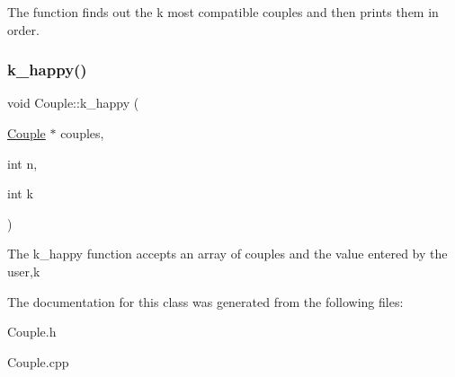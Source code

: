 The function finds out the k most compatible couples and then prints them in order. \mbox{\label{class_couple_a60b6b151595d937d91d7cf9471996a9a}} 
\subsubsection{\texorpdfstring{k\+\_\+happy()}{k\_happy()}}
{\footnotesize\ttfamily void Couple\+::k\+\_\+happy (\begin{DoxyParamCaption}\item[{\hyperlink{class_couple}{Couple} $\ast$}]{couples,  }\item[{int}]{n,  }\item[{int}]{k }\end{DoxyParamCaption})\hspace{0.3cm}{\ttfamily [static]}}

The k\+\_\+happy function accepts an array of couples and the value entered by the user,k 

The documentation for this class was generated from the following files\+:\begin{DoxyCompactItemize}
\item 
Couple.\+h\item 
Couple.\+cpp\end{DoxyCompactItemize}
